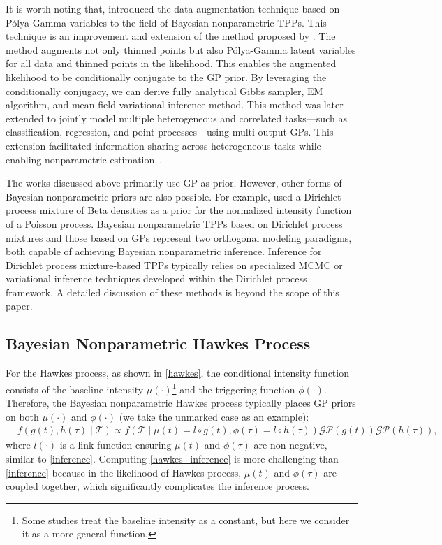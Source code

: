 \documentclass[10pt]{article} %
\begin{document}
It is worth noting that, \citet{donner2018efficient} introduced the data augmentation technique based on P\'{o}lya-Gamma variables to the field of Bayesian nonparametric TPPs. This technique is an improvement and extension of the method proposed by \citet{adams2009tractable}. 
The method augments not only thinned points but also P\'{o}lya-Gamma latent variables for all data and thinned points in the likelihood. This enables the augmented likelihood to be conditionally conjugate to the GP prior. By leveraging the conditionally conjugacy, we can derive fully analytical Gibbs sampler, EM algorithm, and mean-field variational inference method. 
This method was later extended to jointly model multiple heterogeneous and correlated tasks—such as classification, regression, and point processes—using multi-output GPs. This extension facilitated information sharing across heterogeneous tasks while enabling nonparametric estimation~\citep{zhou2023heterogeneous}. 


The works discussed above primarily use GP as prior. However, other forms of Bayesian nonparametric priors are also possible. For example, \citet{kottas2006dirichlet,kottas2007bayesian} used a Dirichlet process mixture of Beta densities as a prior for the normalized intensity function of a Poisson process. 
Bayesian nonparametric TPPs based on Dirichlet process mixtures and those based on GPs represent two orthogonal modeling paradigms, both capable of achieving Bayesian nonparametric inference. Inference for Dirichlet process mixture-based TPPs typically relies on specialized MCMC or variational inference techniques developed within the Dirichlet process framework. A detailed discussion of these methods is beyond the scope of this paper. 




\subsection{Bayesian Nonparametric Hawkes Process}
\label{bayesian_hawkes}

For the Hawkes process, as shown in \cref{hawkes}, the conditional intensity function consists of the baseline intensity \(\mu(\cdot)\)\footnote{Some studies treat the baseline intensity as a constant, but here we consider it as a more general function.} and the triggering function \(\phi(\cdot)\). Therefore, the Bayesian nonparametric Hawkes process typically places GP priors on both \(\mu(\cdot)\) and \(\phi(\cdot)\) (we take the unmarked case as an example): 
\begin{equation}
\begin{aligned}
    &f(g(t),h(\tau) \mid \mathcal{T}) \propto f(\mathcal{T}\mid \mu(t)=l \circ g(t),\phi(\tau)=l \circ h(\tau))\mathcal{GP}(g(t))\mathcal{GP}(h(\tau)), 
\end{aligned}
\label{hawkes_inference}
\end{equation}
where \( l(\cdot)\) is a link function ensuring $\mu(t)$ and $\phi(\tau)$ are non-negative, similar to \cref{inference}. 
Computing \cref{hawkes_inference} is more challenging than \cref{inference} because in the likelihood of Hawkes process, \(\mu(t)\) and \(\phi(\tau)\) are coupled together, which significantly complicates the inference process. 
\end{document}
